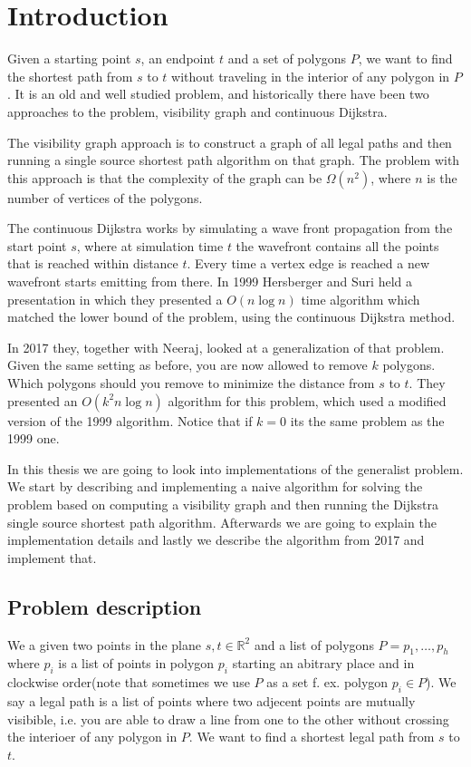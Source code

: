 \chapter{Introduction} Given a starting point $s$, an endpoint $t$ and a set of
polygons $P$, we want to find the shortest path from $s$ to $t$ without
traveling in the interior of any polygon in $P$. It is an old and well studied
problem, and historically there have been two approaches to the problem,
visibility graph and continuous Dijkstra. 

The visibility graph approach is to construct a graph of all legal paths
 and
then running a single source shortest path algorithm on that graph. The problem
with this approach is that the complexity of the graph can be $\Omega(n^2)$,
where $n$ is the number of vertices of the polygons. 

The continuous Dijkstra works by simulating a wave front
propagation from the
start point $s$, where at simulation time $t$ the wavefront contains all the
points that is reached within distance $t$.  Every time a vertex edge is
reached a new wavefront starts emitting from there. In 1999 Hersberger and Suri
held a presentation in which they presented a $O(n\log n)$ time algorithm which
matched the lower bound of the problem, using the continuous Dijkstra method.

In 2017 they, together with Neeraj, looked at a generalization of that problem.
Given the same setting as before, you are now allowed to remove $k$ polygons.
Which polygons should you remove to minimize the distance from $s$ to $t$. They
presented an $O(k^2 n\log n)$ algorithm for this problem, which used a modified
version of the 1999 algorithm. Notice that if $k=0$ its the same problem as the
1999 one.

In this thesis we are going to look into implementations of the generalist
problem. We start by describing and implementing a naive algorithm for solving
the problem based on computing a visibility graph and then running the Dijkstra
single source shortest path algorithm. Afterwards we are going to explain the
implementation details and lastly we describe the algorithm from 2017 and
implement that.
 \section{Problem
description} We a given two points in the plane $s,t\in\mathbb{R}^2$ and a list
of polygons $P=p_1,\dots,p_h$ where $p_i$ is a list of points in polygon $p_i$
starting an abitrary place and in clockwise order(note that sometimes we use
$P$ as a set f. ex. polygon $p_i\in P$). We say a legal path is a list of
points where two adjecent points are mutually visibible, i.e. you are able to
draw a line from one to the other without crossing the interioer of any polygon
in $P$.
We want to find a shortest legal path from $s$ to $t$.

